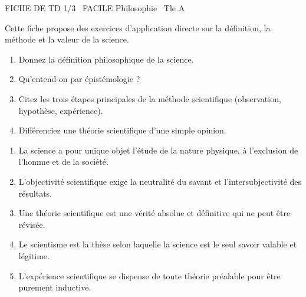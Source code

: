 \documentclass[11pt]{article}
\begin{document}
\begin{tcolorbox}[enhanced,colback=popink,colframe=popink,arc=10pt,boxrule=0pt,left=12pt,right=12pt,top=9pt,bottom=9pt]
{\color{white}\popxbold\small FICHE DE TD 1/3 \textbullet\ FACILE \hfill Philosophie \textbullet\ Tle A\par}
\end{tcolorbox}
\vspace{4pt}
Cette fiche propose des exercices d'application directe sur la définition, la méthode et la valeur de la science.

\begin{exercice}
\begin{enumerate}
    \item Donnez la définition philosophique de la science.
    \item Qu'entend-on par \og épistémologie \fg{} ?
    \item Citez les trois étapes principales de la méthode scientifique (observation, hypothèse, expérience).
    \item Différenciez une théorie scientifique d'une simple opinion.
\end{enumerate}
\end{exercice}

\begin{exercice}
\begin{enumerate}
    \item La science a pour unique objet l'étude de la nature physique, à l'exclusion de l'homme et de la société.
    \item L'objectivité scientifique exige la neutralité du savant et l'intersubjectivité des résultats.
    \item Une théorie scientifique est une vérité absolue et définitive qui ne peut être révisée.
    \item Le scientisme est la thèse selon laquelle la science est le seul savoir valable et légitime.
    \item L'expérience scientifique se dispense de toute théorie préalable pour être purement inductive.
\end{enumerate}
\end{exercice}
\end{document}
